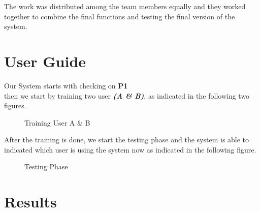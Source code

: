 \documentclass[runningheads]{llncs}
\begin{document}
The work was distributed among the team members equally and they worked together to combine the final functions and testing the final version of the system.

\newpage

%
%
%

\section{User Guide}

Our System starts with checking on \textbf{P1} \\
then we start by training two user \textbf{\textit{(A \& B)}}, as indicated in the following two figures.

\begin{figure}%
    \centering
    \qquad
    \caption{Training User A \& B}%
    \label{fig:example}%
\end{figure}

After the training is done, we start the testing phase and the system is able to indicated which user is using the system now as indicated in the following figure.


\begin{figure}%
    \centering
    \qquad
    \caption{Testing Phase}%
    \label{fig:example}%
\end{figure}

\newpage

%
%
%

\section{Results}
\end{document}
